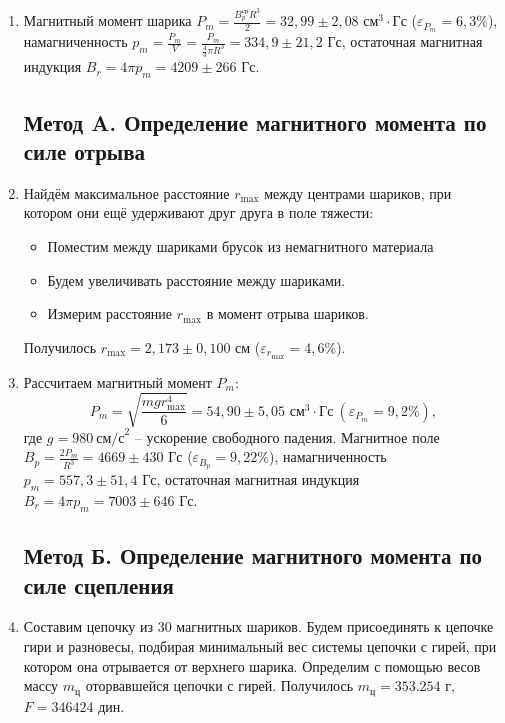 \documentclass[a4paper]{article}
\begin{document}
\begin{enumerate}
\item Магнитный момент шарика $P_m = \frac{B_p^{\text{ср}} R^3}{2} = 32,99 \pm 2,08 \text{ см}^3 \cdot \text{Гс}$ ($\varepsilon_{P_m} = 6,3 \%$), намагниченность $p_m = \frac{P_m}{V} = \frac{P_m}{\frac{4}{3} \pi R^3} = 334,9 \pm 21,2$ Гс, остаточная магнитная индукция $B_r = 4 \pi p_m = 4209 \pm 266$ Гс.

\subsection*{Метод A. Определение магнитного момента по силе отрыва}

    \item Найдём максимальное расстояние $r_{\text{max}}$ между центрами шариков, при котором они ещё удерживают друг друга в поле тяжести:
    \begin{itemize}
        \item Поместим между шариками брусок из немагнитного материала
        \item Будем увеличивать расстояние между шариками.
        \item Измерим расстояние $r_{\text{max}}$ в момент отрыва шариков. 
    \end{itemize}
    
	Получилось $r_{\text{max}} = 2,173 \pm 0,100$ см ($\varepsilon_{r_{\text{max}}} = 4,6 \%$).
    \item Рассчитаем магнитный момент $P_{m}$:
    \[
    P_{m} = \sqrt{\frac{mg r_{\text{max}}^4}{6}} = 54,90 \pm 5,05 \text{ см}^3 \cdot \text{Гс} \ (\varepsilon_{P_m} = 9,2 \%),
    \]
    где $g = 980\ \text{см/с}^2$ -- ускорение свободного падения. Магнитное поле $B_p = \frac{2 P_m}{R^3} = 4669 \pm 430$ Гс ($\varepsilon_{B_p} = 9,22 \%$), намагниченность $p_m = 557,3 \pm 51,4$ Гс, остаточная магнитная индукция $B_r = 4 \pi p_m = 7003 \pm 646$ Гс.

\subsection*{Метод Б. Определение магнитного момента по силе сцепления}

    \item Составим цепочку из 30 магнитных шариков. Будем присоединять к цепочке гири и разновесы, подбирая минимальный вес системы цепочки с гирей, при котором она отрывается от верхнего шарика. Определим с помощью весов массу $m_{\text{ц}}$ оторвавшейся цепочки с гирей. Получилось $m_{\text{ц}} = 353.254$ г, $F = 346424$ дин.
    

\end{enumerate}
\end{document}
